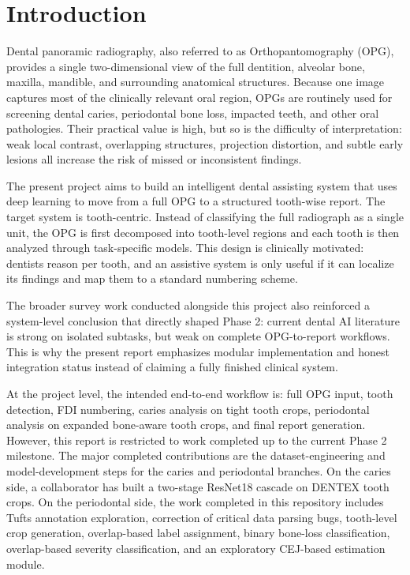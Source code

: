 
\chapter{Introduction}
\label{ch:introduction}

Dental panoramic radiography, also referred to as Orthopantomography (OPG),
provides a single two-dimensional view of the full dentition, alveolar bone,
maxilla, mandible, and surrounding anatomical structures. Because one image
captures most of the clinically relevant oral region, OPGs are routinely used
for screening dental caries, periodontal bone loss, impacted teeth, and other
oral pathologies. Their practical value is high, but so is the difficulty of
interpretation: weak local contrast, overlapping structures, projection
distortion, and subtle early lesions all increase the risk of missed or
inconsistent findings.

The present project aims to build an intelligent dental assisting system that
uses deep learning to move from a full OPG to a structured tooth-wise report.
The target system is tooth-centric. Instead of classifying the full radiograph
as a single unit, the OPG is first decomposed into tooth-level regions and each
tooth is then analyzed through task-specific models. This design is clinically
motivated: dentists reason per tooth, and an assistive system is only useful if
it can localize its findings and map them to a standard numbering scheme.

The broader survey work conducted alongside this project also reinforced a
system-level conclusion that directly shaped Phase 2: current dental AI
literature is strong on isolated subtasks, but weak on complete OPG-to-report
workflows. This is why the present report emphasizes modular implementation and
honest integration status instead of claiming a fully finished clinical system.

At the project level, the intended end-to-end workflow is: full OPG input,
tooth detection, FDI numbering, caries analysis on tight tooth crops,
periodontal analysis on expanded bone-aware tooth crops, and final report
generation. However, this report is restricted to work completed up to the
current Phase 2 milestone. The major completed contributions are the
dataset-engineering and model-development steps for the caries and periodontal
branches. On the caries side, a collaborator has built a two-stage ResNet18
cascade on DENTEX tooth crops. On the periodontal side, the work completed in
this repository includes Tufts annotation exploration, correction of critical
data parsing bugs, tooth-level crop generation, overlap-based label assignment,
binary bone-loss classification, overlap-based severity classification, and an
exploratory CEJ-based estimation module.

